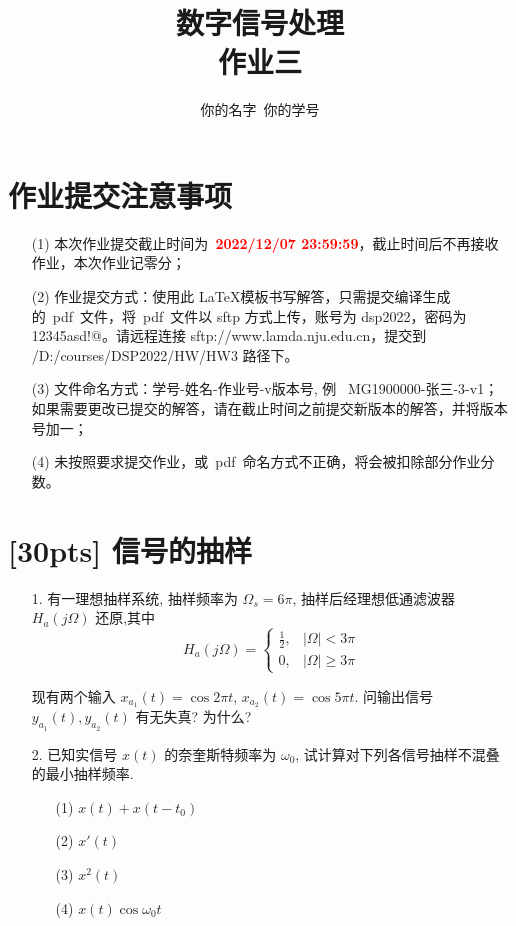 \documentclass[a4paper,UTF8]{article}
\numberwithin{equation}{section}
\begin{document}
	
	\title{数字信号处理\\
		作业三}
	\author{你的名字\, 你的学号} 
	\maketitle
	
	\section*{作业提交注意事项}
	\begin{tcolorbox}
		\begin{enumerate}
			\item[(1)] 本次作业提交截止时间为~\textcolor{red}{\textbf{2022/12/07  23:59:59}}，截止时间后不再接收作业，本次作业记零分；
			\item[(2)] 作业提交方式：使用此 \LaTeX 模板书写解答，只需提交编译生成的~pdf~文件，将~pdf~文件以 sftp 方式上传，账号为 dsp2022，密码为 12345asd!@。请远程连接 sftp://www.lamda.nju.edu.cn，提交到 /D:/courses/DSP2022/HW/HW3 路径下。
			\item[(3)] 文件命名方式：学号-姓名-作业号-v版本号, 例~ MG1900000-张三-3-v1；如果需要更改已提交的解答，请在截止时间之前提交新版本的解答，并将版本号加一；
			\item[(4)] 未按照要求提交作业，或~pdf~命名方式不正确，将会被扣除部分作业分数。
			
		\end{enumerate}
	\end{tcolorbox}
	
	
	\newpage
	\section{[30pts] 信号的抽样}
	\begin{itemize}
		\item[1.]有一理想抽样系统, 抽样频率为 $\Omega_{s}=6 \pi$, 抽样后经理想低通滤波器 $H_a({j} \Omega)$ 还原,其中
		$$
		H_a({j} \Omega)= \begin{cases}\frac{1}{2}, & |\Omega|<3 \pi \\ 0, & |\Omega| \geqslant 3 \pi\end{cases}
		$$
		
		现有两个输入 $x_{a_1}(t)=\cos 2 \pi t$, $x_{a_2}(t)=\cos 5 \pi t$. 问输出信号 $y_{a_1}(t), y_{a_2}(t)$ 有无失真? 为什么?
		\item[2.] 已知实信号 $x(t)$ 的奈奎斯特频率为 $\omega_0$, 试计算对下列各信号抽样不混叠的最小抽样频率.
		\begin{itemize}
			\item[(1)]$ x(t)+x(t-t_0) $
			\item[(2)]$ x'(t) $
			\item[(3)]$ x^2(t) $
			\item[(4)]$ x(t)\cos \omega_0 t $
		\end{itemize}
	\end{itemize}
	
\end{document}

